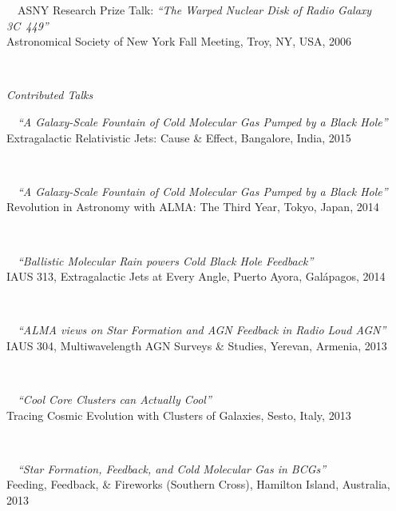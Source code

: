 \documentclass[11pt]{article}
\begin{document}
\hspace{42mm} \parbox{5.15in}{
\textbullet~~ASNY Research Prize Talk: {\it ``The Warped Nuclear Disk of Radio Galaxy 3C~449''}\\ Astronomical Society of New York Fall Meeting, Troy, NY, USA, 2006}\\




\vspace{4mm}



\hspace{2.5mm} \parbox{1.5in}{{\it Contributed Talks}\\} \parbox{5.15in}{
\textbullet~~{\it ``A Galaxy-Scale Fountain of Cold Molecular Gas Pumped by a Black Hole''} \\ 
Extragalactic Relativistic Jets: Cause \& Effect, Bangalore, India, 2015}\\


\hspace{42mm} \parbox{5.15in}{
\textbullet~~{\it ``A Galaxy-Scale Fountain of Cold Molecular Gas Pumped by a Black Hole''} \\ 
Revolution in Astronomy with ALMA: The Third Year, Tokyo, Japan, 2014}\\


\hspace{42mm} \parbox{5.15in}{
\textbullet~~{\it ``Ballistic Molecular Rain powers Cold Black Hole Feedback''} \\ 
IAUS 313, Extragalactic Jets at Every Angle, Puerto Ayora, Gal\'{a}pagos, 2014}\\

\hspace{42mm} \parbox{5.15in}{
\textbullet~~{\it ``ALMA views on Star Formation and AGN Feedback in Radio Loud AGN''} \\ 
IAUS 304, Multiwavelength AGN Surveys \& Studies, Yerevan, Armenia, 2013}\\


\hspace{42mm} \parbox{5.15in}{
\textbullet~~{\it ``Cool Core Clusters can Actually Cool''} \\ Tracing Cosmic Evolution with Clusters of Galaxies, Sesto, Italy, 2013} \\


\hspace{42mm} \parbox{5.15in}{
\textbullet~~{\it ``Star Formation, Feedback, and Cold Molecular Gas in BCGs''} \\ Feeding, Feedback, \& Fireworks (Southern Cross), Hamilton Island, Australia, 2013} \\
\end{document}
